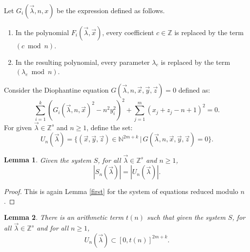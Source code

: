 \documentclass[10pt,a4paper]{article}
\theoremstyle{plain}
\newtheorem{lemma}{Lemma}[section]
\begin{document}
Let $G_i(\vec \lambda, n, x)$ be the expression defined as follows. 
\begin{enumerate}
    \item In the polynomial $F_i(\vec \lambda, \vec x)$, every coefficient $c \in \mathbb Z$ is replaced by the term $(c \bmod n)$. 
    \item In the resulting polynomial, every parameter $\lambda_{e}$ is replaced by the term $(\lambda_{e} \bmod n)$. 
\end{enumerate}
Consider the Diophantine equation $G(\vec \lambda, n, \vec x, \vec y, \vec z) = 0$ defined as:
$$\sum _{i = 1}^k {\left ( {G_i(\vec \lambda,n, \vec x)}^2 - n^2 y_i^2 \right )}^2 + \sum _{j = 1}^m {(x_j + z_j - n + 1)}^2 = 0.$$
For given $\vec \lambda \in \mathbb Z^{s}$ and $n \geq 1$, define the set:
$$U_n(\vec \lambda) = \{(\vec x, \vec y, \vec z) \in \mathbb N^{2m + k} \,|\, G(\vec \lambda, n, \vec x, \vec y, \vec z) = 0 \}. $$ 
\begin{lemma}
    Given the system $S$, for all $\vec \lambda \in \mathbb Z ^s$ and $n \geq 1$, 
    $$|S_n(\vec \lambda) | = |U_n(\vec \lambda)| .$$
\end{lemma}

\begin{proof} This is again Lemma \ref{first} for the system of equations reduced modulo $n$. \end{proof}

\begin{lemma}\label{lem:sufficientt}
   There is an arithmetic term $t(n)$ such that given the system $S$, for all $\vec \lambda \in \mathbb Z^s$ and for all $n \geq 1$, 
   $$U_n(\vec \lambda ) \subset [0, t(n)]^{2m + k}.$$
\end{lemma} 
\end{document}
